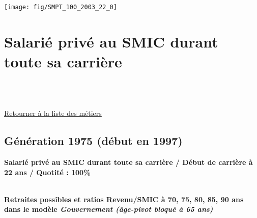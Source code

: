  \vspace{0.1cm} 

 {\hspace{-2.2cm}\texttt{[image: fig/SMPT\_100\_2003\_22\_0]}} 

\newpage 
 
\chapter{Salarié privé au SMIC durant toute sa carrière} 

~\\ 
 


   
 \localtableofcontents 

~\\ 
 
 \hyperlink{page.2}{\noindent Retourner à la liste des métiers}

 \newpage 

\section{Génération 1975 (début en 1997)\label{SMIC_100_1975_22_0}} 
 
{\bf \noindent Salarié privé au SMIC durant toute sa carrière / Début de carrière à 22 ans / Quotité : 100\%}  ~ 

 ~\\{\bf \noindent Retraites possibles et ratios Revenu/SMIC à 70, 75, 80, 85, 90 ans dans le modèle \emph{Gouvernement (âge-pivot bloqué à 65 ans)}}  
 
